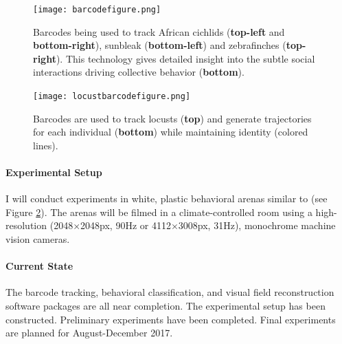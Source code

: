\documentclass[11pt,a4paper,oneside]{article}
\begin{document}
	\begin{figure}
		\begin{center}
			\texttt{[image: barcodefigure.png]}\\
		\end{center}
		\begin{flushleft}
			\caption{Barcodes being used to track African cichlids (\textbf{top-left} and \textbf{bottom-right}), sunbleak (\textbf{bottom-left}) and zebrafinches (\textbf{top-right}). This technology gives detailed insight into the subtle social interactions driving collective behavior (\textbf{bottom}).\label{fig:barcodefigure}} 
		\end{flushleft}
	\end{figure} 
	
	\begin{figure}
		\begin{center}
			\texttt{[image: locustbarcodefigure.png]}\\
		\end{center}
		\begin{flushleft}
			\caption{Barcodes are used to track locusts (\textbf{top}) and generate trajectories for each individual (\textbf{bottom}) while maintaining identity (colored lines).\label{fig:locustbarcodefigure}} 
		\end{flushleft}
	\end{figure} 

	\paragraph{Experimental Setup}
	I will conduct experiments in white, plastic behavioral arenas similar to \citet{buhl2006disorder,bazazi2008collective,bazazi2011nutritional} (see Figure \ref{fig:locustbarcodefigure}). The arenas will be filmed in a climate-controlled room using a high-resolution (2048$\times$2048px, 90Hz or 4112$\times$3008px, 31Hz), monochrome machine vision cameras.

	\paragraph{Current State}
	The barcode tracking, behavioral classification, and visual field reconstruction software packages are all near completion. The experimental setup has been constructed. Preliminary experiments have been completed. Final experiments are planned for August-December 2017.
	
\end{document}
